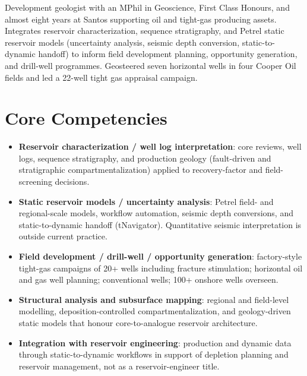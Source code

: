 \documentclass[11pt,a4paper,sans]{moderncv}
\begin{document}
\makecvtitle

\vspace{6pt}
\small{Development geologist with an MPhil in Geoscience, First Class Honours, and almost eight years at Santos supporting oil and tight-gas producing assets. Integrates reservoir characterization, sequence stratigraphy, and Petrel static reservoir models (uncertainty analysis, seismic depth conversion, static-to-dynamic handoff) to inform field development planning, opportunity generation, and drill-well programmes. Geosteered seven horizontal wells in four Cooper Oil fields and led a 22-well tight gas appraisal campaign.}

\section{Core Competencies}
\vspace{1pt}
\begin{itemize}

\item \textbf{Reservoir characterization / well log interpretation}: core reviews, well logs, sequence stratigraphy, and production geology (fault-driven and stratigraphic compartmentalization) applied to recovery-factor and field-screening decisions.

\item \textbf{Static reservoir models / uncertainty analysis}: Petrel field- and regional-scale models, workflow automation, seismic depth conversions, and static-to-dynamic handoff (tNavigator). Quantitative seismic interpretation is outside current practice.

\item \textbf{Field development / drill-well / opportunity generation}: factory-style tight-gas campaigns of 20+ wells including fracture stimulation; horizontal oil and gas well planning; conventional wells; 100+ onshore wells overseen.

\item \textbf{Structural analysis and subsurface mapping}: regional and field-level modelling, deposition-controlled compartmentalization, and geology-driven static models that honour core-to-analogue reservoir architecture.

\item \textbf{Integration with reservoir engineering}: production and dynamic data through static-to-dynamic workflows in support of depletion planning and reservoir management, not as a reservoir-engineer title.

\end{itemize}
\end{document}
